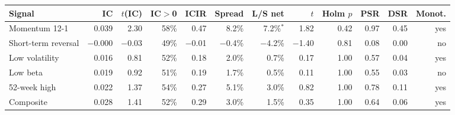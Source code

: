 \begin{tabular}{lrrrrrrrrrrr}
\toprule
Signal & IC & $t$(IC) & IC$>$0 & ICIR & Spread & L/S net & $t$ & Holm $p$ & PSR & DSR & Monot. \\
\midrule
Momentum 12-1 & 0.039 & 2.30 & 58\% & 0.47 & 8.2\% & 7.2\%$^{*}$ & 1.82 & 0.42 & 0.97 & 0.45 & yes \\
Short-term reversal & $-$0.000 & $-$0.03 & 49\% & $-$0.01 & $-$0.4\% & $-$4.2\% & $-$1.40 & 0.81 & 0.08 & 0.00 & no \\
Low volatility & 0.016 & 0.81 & 52\% & 0.18 & 2.0\% & 0.7\% & 0.17 & 1.00 & 0.57 & 0.04 & yes \\
Low beta & 0.019 & 0.92 & 51\% & 0.19 & 1.7\% & 0.5\% & 0.11 & 1.00 & 0.55 & 0.03 & no \\
52-week high & 0.022 & 1.37 & 54\% & 0.27 & 5.1\% & 3.0\% & 0.82 & 1.00 & 0.78 & 0.11 & yes \\
\midrule
Composite & 0.028 & 1.41 & 52\% & 0.29 & 3.0\% & 1.5\% & 0.35 & 1.00 & 0.64 & 0.06 & yes \\
\bottomrule
\end{tabular}
